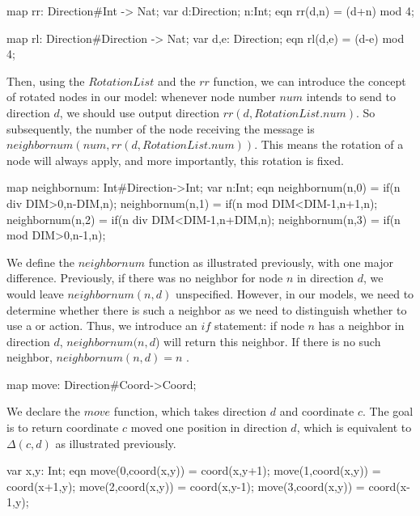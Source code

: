 \begin{codeverb}
map     rr: Direction#Int -> Nat;
var     d:Direction;
        n:Int;
eqn     rr(d,n) = (d+n) mod 4;

map     rl: Direction#Direction -> Nat;
var     d,e: Direction;
eqn     rl(d,e) = (d-e) mod 4;
\end{codeverb}

Then, using the $RotationList$ and the $rr$ function, we can introduce the concept of rotated nodes in our model: whenever node number $num$ intends to send to direction $d$, we should use output direction $rr(d,RotationList.num)$. So subsequently, the number of the node receiving the message is $neighbornum(num,rr(d,RotationList.num))$. This means the rotation of a node will always apply, and more importantly, this rotation is fixed.

\begin{codeverb}
map     neighbornum: Int#Direction->Int;
var     n:Int;
eqn     neighbornum(n,0) = if(n div DIM>0,n-DIM,n);
        neighbornum(n,1) = if(n mod DIM<DIM-1,n+1,n);
        neighbornum(n,2) = if(n div DIM<DIM-1,n+DIM,n);
        neighbornum(n,3) = if(n mod DIM>0,n-1,n);
\end{codeverb}

We define the $neighbornum$ function as illustrated previously, with one major difference. Previously, if there was no neighbor for node $n$ in direction $d$, we would leave $neighbornum(n,d)$ unspecified. However, in our models, we need to determine whether there is such a neighbor as we need to distinguish whether to use a  or  action. Thus, we introduce an $if$ statement: if node $n$ has a neighbor in direction $d$, $neighbornum(n,d$) will return this neighbor. If there is no such neighbor, $neighbornum(n,d) = n$ .

\begin{codeverb}
map     move: Direction#Coord->Coord;
\end{codeverb}

We declare the $move$ function, which takes direction $d$ and coordinate $c$. The goal is to return coordinate $c$ moved one position in direction $d$, which is equivalent to $\Delta(c,d)$ as illustrated previously.

\begin{codeverb}
var     x,y: Int;
eqn     move(0,coord(x,y)) = coord(x,y+1);
        move(1,coord(x,y)) = coord(x+1,y);
        move(2,coord(x,y)) = coord(x,y-1);
        move(3,coord(x,y)) = coord(x-1,y);
\end{codeverb}

